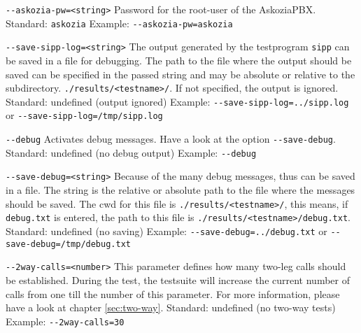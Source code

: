 \begin{description}
\item {\texttt{-{}-askozia-pw=<string>}} \newline
Password for the root-user of the AskoziaPBX.
\newline Standard: \texttt{askozia}
\newline Example: \texttt{-{}-askozia-pw=askozia}

\item {\texttt{-{}-save-sipp-log=<string>}} \newline
The output generated by the testprogram \texttt{sipp} can be saved in a file for debugging.
The path to the file where the output should be saved can be specified in the
passed string and may be absolute or relative to the subdirectory.
\texttt{./results/<testname>/}. If not specified, the output is ignored.
\newline Standard: undefined (output ignored)
\newline Example: \texttt{-{}-save-sipp-log=../sipp.log} or \texttt{-{}-save-sipp-log=/tmp/sipp.log}

\item {\texttt{-{}-debug}} \newline
Activates debug messages. Have a look at the option \texttt{-{}-save-debug}.
\newline Standard: undefined (no debug output)
\newline Example: \texttt{-{}-debug}

\item {\texttt{-{}-save-debug=<string>}} \newline
Because of the many debug messages, thus can be saved in a file.
The string is the relative or absolute path to the file where the
messages should be saved. The cwd for this file is \texttt{./results/<testname>/},
this means, if \texttt{debug.txt} is entered, the path to this file is
\texttt{./results/<testname>/debug.txt}.
\newline Standard: undefined (no saving)
\newline Example: \texttt{-{}-save-debug=../debug.txt} or \texttt{-{}-save-debug=/tmp/debug.txt}

\item {\texttt{-{}-2way-calls=<number>}} \newline
This parameter defines how many two-leg calls should be established.
During the test, the testsuite will increase the current number of calls
from one till the number of this parameter.
For more information, please have a look at chapter \ref{sec:two-way}.
\newline Standard: undefined (no two-way tests)
\newline Example: \texttt{-{}-2way-calls=30}


\end{description}
